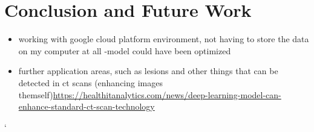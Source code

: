 \documentclass[12pt]{article}
\providecommand{\tightlist}{%
  \setlength{\itemsep}{0pt}\setlength{\parskip}{0pt}}
\begin{document}
\hypertarget{conclusion-and-future-work}{%
\section{Conclusion and Future Work}\label{conclusion-and-future-work}}

\begin{itemize}
\tightlist
\item
  working with google cloud platform environment, not having to store
  the data on my computer at all -model could have been optimized
\item
  further application areas, such as lesions and other things that can
  be detected in ct scans (enhancing images
  themself)\url{https://healthitanalytics.com/news/deep-learning-model-can-enhance-standard-ct-scan-technology}
\end{itemize}

`



\end{document}
